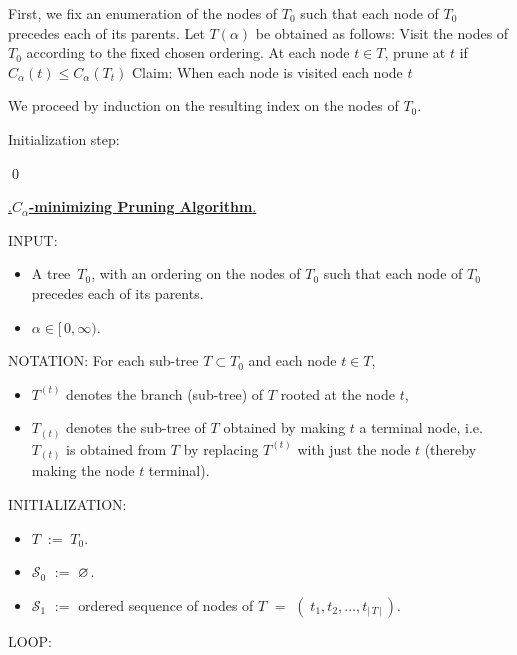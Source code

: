 \vskip 1.5cm
First, we fix an enumeration of the nodes of $T_{0}$ such that
each node of $T_{0}$ precedes each of its parents.
Let $T(\alpha)$ be obtained as follows:
Visit the nodes of $T_{0}$ according to the fixed chosen ordering.
At each node $t \in T$, prune at $t$ if $C_{\alpha}(t) \leq C_{\alpha}(T_{t})$
Claim: When each node is visited each node $t$

We proceed by induction on the resulting index on the nodes of $T_{0}$.

Initialization step: 

\qed

\begin{center}
\begin{tcolorbox}[width=0.90\linewidth,colback=white,colframe=gray]
\begin{center}
\vskip 0.2cm
\underline{{\color{white}.}\textbf{\large$C_{\alpha}$-minimizing Pruning Algorithm}{\color{white}.}}
\end{center}
\vskip 0.5cm
INPUT:
\begin{itemize}
\item
	A tree \,$T_{0}$, with an ordering on the nodes of $T_{0}$
	such that each node of $T_{0}$ precedes each of its parents.
\item
	$\alpha \in [\,0,\infty)$.
\end{itemize}
\vskip 0.3cm
NOTATION:
\vskip 0.2cm
For each sub-tree $T \subset T_{0}$ and each node $t \in T$,
\begin{itemize}
\item
	$T^{(t)}$ denotes the branch (sub-tree) of $T$ rooted at the node $t$,
\item
	$T_{(t)}$ denotes the sub-tree of $T$ obtained by making $t$ a terminal node,
	i.e. $T_{(t)}$ is obtained from $T$ by replacing $T^{(t)}$
	with just the node $t$ (thereby making the node $t$ terminal).
\end{itemize}
\vskip 0.3cm
INITIALIZATION:
\begin{itemize}
\item
	$T \; := \; T_{0}$.
\item
	$\mathcal{S}_{0}$ \;$:=$\; $\varnothing$.
\item
	$\mathcal{S}_{1}$
	\;$:=$\;
		\textnormal{ordered sequence of nodes of $T$}
	\;$=$\;
		$\left(\;t_{1}, t_{2}, \ldots, t_{\vert\,T\,\vert}\,\right)$.
\end{itemize}
\vskip 0.3cm
LOOP:
\vskip 0.1cm
\begin{center}
\begin{minipage}{0.85\linewidth}

\end{minipage}
\end{center}
\end{tcolorbox}
\end{center}
